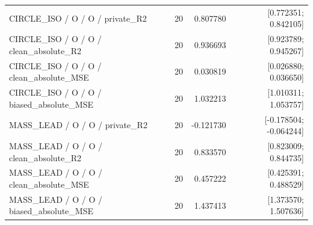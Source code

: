 \begin{longtable}{p{.56\linewidth}rrr}
CIRCLE\_ISO / O / O / private\_R2 & 20 & 0.807780 & [0.772351; 0.842105] \\
CIRCLE\_ISO / O / O / clean\_absolute\_R2 & 20 & 0.936693 & [0.923789; 0.945267] \\
CIRCLE\_ISO / O / O / clean\_absolute\_MSE & 20 & 0.030819 & [0.026880; 0.036650] \\
CIRCLE\_ISO / O / O / biased\_absolute\_MSE & 20 & 1.032213 & [1.010311; 1.053757] \\
MASS\_LEAD / O / O / private\_R2 & 20 & -0.121730 & [-0.178504; -0.064244] \\
MASS\_LEAD / O / O / clean\_absolute\_R2 & 20 & 0.833570 & [0.823009; 0.844735] \\
MASS\_LEAD / O / O / clean\_absolute\_MSE & 20 & 0.457222 & [0.425391; 0.488529] \\
MASS\_LEAD / O / O / biased\_absolute\_MSE & 20 & 1.437413 & [1.373570; 1.507636] \\
\bottomrule\end{longtable}
